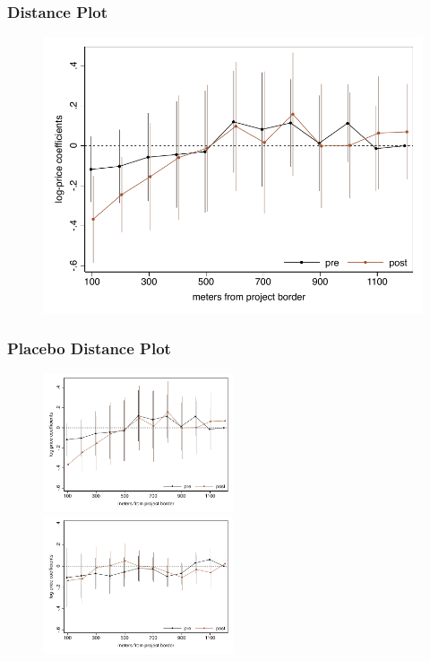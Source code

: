 \documentclass[aspectratio=149]{beamer}
\begin{document}
\begin{frame}
\frametitle{Distance Plot}
\begin{center}
\begin{figure}
\includegraphics[scale=0.72]{distplot.pdf}
\vspace{-3mm}
\end{figure}
\end{center}
\end{frame}



\begin{frame}
\frametitle{Placebo Distance Plot}
\begin{center}
\begin{figure}


\includegraphics[width=0.5\textwidth,trim={.77cm 0cm .21cm 0cm}]{distplot.pdf}
   \hfill
\includegraphics[width=0.5\textwidth,trim={.77cm 0cm .21cm 0cm},clip]{distplot_placebo.pdf}

\end{figure}
\end{center}
\end{frame}
\end{document}

